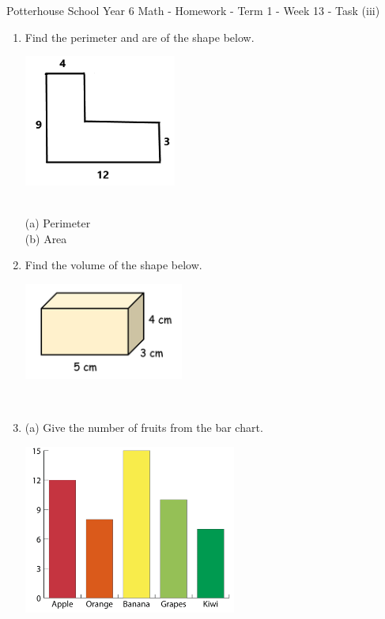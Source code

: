 \documentclass{article}
\date{}
\begin{document}
\fontsize{12}{13} \selectfont %

\begin{center}
Potterhouse School \hspace{3cm} Year 6 Math - Homework - Term 1 - Week 13 - Task (iii) 
\end{center}

\begin{enumerate}
    \item  \quad Find the perimeter and are of the shape below. 
\begin{center} 
\includegraphics[width=5cm]{Year_6_Mixed_Tests/Homework_Tasks/cpd_shp_2.png}
\end{center}

\\
(a) Perimeter \\
(b) Area \\

\item \quad Find the volume of the shape below. \\
\begin{center}
    \includegraphics{Year_6_Mixed_Tests/Homework_Tasks/Cuboid_vol.png}
\end{center}
\\

\item \quad (a) Give the number of fruits from the bar chart. \\
\begin{center}
    \includegraphics[width=7cm]{Year_6_Mixed_Tests/Homework_Tasks/Bar_chart_2.png}
\end{center}
\\


\end{enumerate}
\end{document}
